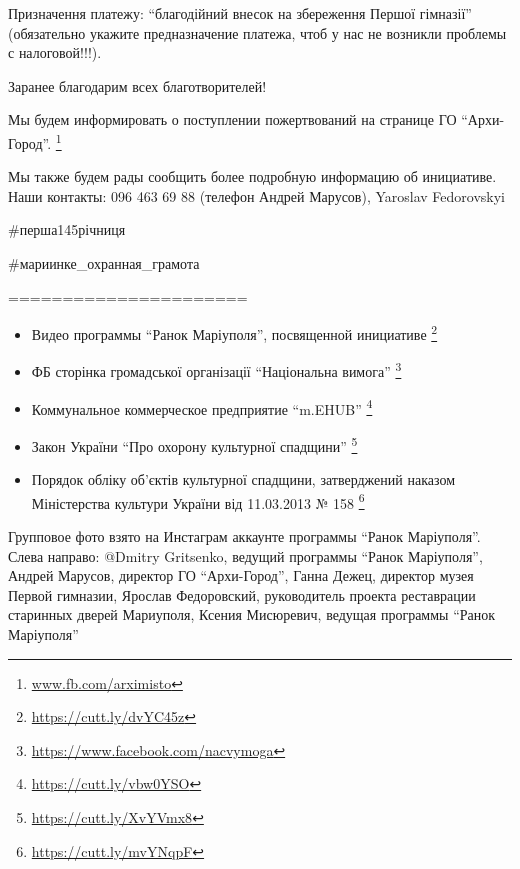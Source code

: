 Призначення платежу: \enquote{благодійний внесок на збереження Першої гімназії}
(обязательно укажите предназначение платежа, чтоб у нас не возникли проблемы с
налоговой!!!).

Заранее благодарим всех благотворителей!

Мы будем информировать о поступлении пожертвований на странице ГО \enquote{Архи-Город}.
\footnote{\url{www.fb.com/arximisto}}

Мы также будем рады сообщить более подробную информацию об инициативе. Наши
контакты: 096 463 69 88 (телефон Андрей Марусов), Yaroslav Fedorovskyi 

\#перша145річниця 

\#мариинке\_охранная\_грамота

======================

\begin{itemize} %
\item Видео программы \enquote{Ранок Маріуполя}, посвященной инициативе \footnote{\url{https://cutt.ly/dvYC45z}}
\item ФБ сторінка громадської організації \enquote{Національна вимога} \footnote{\url{https://www.facebook.com/nacvymoga}}
\item Коммунальное коммерческое предприятие \enquote{m.EHUB} \footnote{\url{https://cutt.ly/vbw0YSO}}
\item Закон України \enquote{Про охорону культурної спадщини} \footnote{\url{https://cutt.ly/XvYVmx8}}
\item Порядок обліку об'єктів культурної спадщини, затверджений наказом Міністерства культури України від 11.03.2013 № 158 %
\footnote{\url{https://cutt.ly/mvYNqpF}}
\end{itemize} %

Групповое фото взято на Инстаграм аккаунте программы \enquote{Ранок Маріуполя}. Слева
направо: @Dmitry Gritsenko, ведущий программы \enquote{Ранок Маріуполя}, Андрей
Марусов, директор ГО \enquote{Архи-Город}, Ганна Дежец, директор музея Первой гимназии,
Ярослав Федоровский, руководитель проекта реставрации старинных дверей
Мариуполя, Ксения Мисюревич, ведущая программы \enquote{Ранок Маріуполя}

